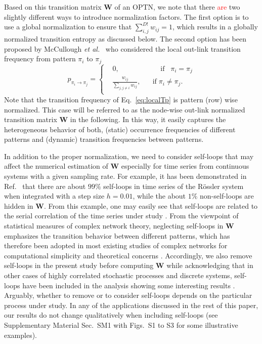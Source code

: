 \documentclass[aip,cha,reprint,nofootinbib]{revtex4-1}
\begin{document}
Based on this transition matrix $\mathbf{W}$ of an OPTN, we note that there \textcolor{red}{are} two slightly different ways to introduce normalization factors. The first option \cite{zhangSciRep2017} is to use a global normalization to ensure that $\sum_{i,j}^{D!} w_{ij} = 1$, which results in a globally normalized transition entropy as discussed below. The second option has been proposed by McCullough {\textit{et al.}}~\cite{McCullough2017b} who considered the local out-link transition frequency from pattern $\pi_i$ to $\pi_j$
\begin{equation} \label{eq:localTp}
p_{\pi_i \to \pi_j} = \left \{ \begin{aligned}
				& 0,  \;\;\;\;\;\;\;\;\;\;\;\;\;\;\;\;\;\;\;\;\; \text{if} \;\;\; \pi_i = \pi_j \\
				& \frac{w_{ij}}{\sum_{j, j \neq i} w_{ij}}, \;\;\;\;\;\; \text{if} \; \pi_i \neq \pi_j.\\
				\end{aligned}
				\right.
\end{equation}
\noindent
Note that the transition frequency of Eq.~\eqref{eq:localTp} is pattern (row) wise normalized. This case will be referred to as the node-wise out-link normalized transition matrix $\mathbf{W}$ in the following. In this way, it easily captures the heterogeneous behavior of both, (static) occurrence frequencies of different patterns and (dynamic) transition frequencies between patterns. 

In addition to the proper normalization, we need to consider self-loops that may affect the numerical estimation of $\mathbf{W}$ especially for time series from continuous systems with a given sampling rate. For example, it has been demonstrated in Ref.~\cite{zhangSciRep2017} that there are about $99\%$ self-loops in time series of the R\"ossler system when integrated with a step size $h = 0.01$, while the about $1\%$ non-self-loops are hidden in $\mathbf{W}$. From this example, one may easily see that self-loops are related to the serial correlation of the time series under study \cite{BorgesAMC2019}. {\color{red} From the viewpoint of statistical measures of complex network theory}, neglecting self-loops in $\mathbf{W}$ emphasizes the transition behavior between different patterns, which has therefore been adopted in most existing studies of complex networks for computational simplicity and theoretical concerns \cite{CostaADPhy2007}. Accordingly, we also remove self-loops in the present study before computing $\mathbf{W}$ while acknowledging that in other cases of {\color{red} highly correlated} stochastic processes and discrete systems, self-loops have been included in the analysis showing some interesting results \cite{BorgesAMC2019}. Arguably, whether to remove or to consider self-loops depends on the particular process under study. In any of the applications discussed in the rest of this paper, our results do not change qualitatively when including self-loops {\color{red}(see Supplementary Material Sec.~SM1 with Figs.~S1 to S3 for some illustrative examples).}
\end{document}
